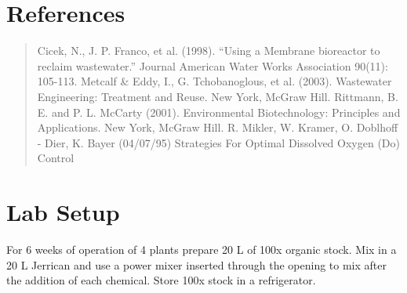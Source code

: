 \documentclass[letterpaper,10pt,english]{sphinxmanual}
\begin{document}
\section{References}
\label{\detokenize{Nutrient_Removal/Nutrient_Removal:references}}\label{\detokenize{Nutrient_Removal/Nutrient_Removal:heading-nrp-references}}\begin{quote}

Cicek, N., J. P. Franco, et al. (1998). “Using a Membrane bioreactor to reclaim wastewater.” Journal American Water Works Association 90(11): 105-113.
Metcalf \& Eddy, I., G. Tchobanoglous, et al. (2003). Wastewater Engineering: Treatment and Reuse. New York, McGraw Hill.
Rittmann, B. E. and P. L. McCarty (2001). Environmental Biotechnology: Principles and Applications. New York, McGraw Hill.
R. Mikler, W. Kramer, O. Doblhoff - Dier, K. Bayer (04/07/95) Strategies For Optimal Dissolved Oxygen (Do) Control 
\end{quote}


\section{Lab Setup}
\label{\detokenize{Nutrient_Removal/Nutrient_Removal:lab-setup}}\label{\detokenize{Nutrient_Removal/Nutrient_Removal:heading-nrp-lab-setup}}
For 6 weeks of operation of 4 plants prepare 20 L of 100x organic stock. Mix in a 20 L Jerrican and use a power mixer inserted through the opening to mix after the addition of each chemical. Store 100x stock in a refrigerator.
\end{document}
